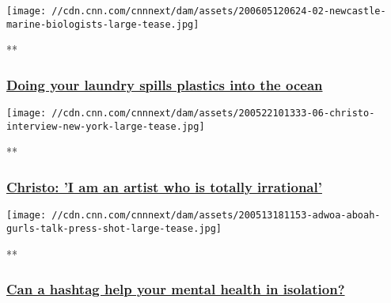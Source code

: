 \href{/videos/fashion/2020/06/05/plastic-microfiber-laundry-solutions-oceans-project-planet-lon-orig.cnn-style/video/playlists/cnn-style/}{}

\texttt{[image: //cdn.cnn.com/cnnnext/dam/assets/200605120624-02-newcastle-marine-biologists-large-tease.jpg]}

**

\hypertarget{doing-your-laundry-spills-plastics-into-the-ocean}{%
\subsubsection{\texorpdfstring{\href{/videos/fashion/2020/06/05/plastic-microfiber-laundry-solutions-oceans-project-planet-lon-orig.cnn-style/video/playlists/cnn-style/}{Doing
your laundry spills plastics into the
ocean}}{Doing your laundry spills plastics into the ocean}}\label{doing-your-laundry-spills-plastics-into-the-ocean}}

\href{/videos/arts/2020/05/22/christo-interview-new-york-arc-de-triomphe-lon-orig.cnn/video/playlists/cnn-style/}{}

\texttt{[image: //cdn.cnn.com/cnnnext/dam/assets/200522101333-06-christo-interview-new-york-large-tease.jpg]}

**

\hypertarget{christo-i-am-an-artist-who-is-totally-irrational}{%
\subsubsection{\texorpdfstring{\href{/videos/arts/2020/05/22/christo-interview-new-york-arc-de-triomphe-lon-orig.cnn/video/playlists/cnn-style/}{Christo:
'I am an artist who is totally
irrational'}}{Christo: 'I am an artist who is totally irrational'}}\label{christo-i-am-an-artist-who-is-totally-irrational}}

\href{/videos/fashion/2020/05/13/adwoa-aboah-gurls-talk-coronavirus-mental-health-wellness-lon-orig.cnn/video/playlists/cnn-style/}{}

\texttt{[image: //cdn.cnn.com/cnnnext/dam/assets/200513181153-adwoa-aboah-gurls-talk-press-shot-large-tease.jpg]}

**

\hypertarget{can-a-hashtag-help-your-mental-health-in-isolation}{%
\subsubsection{\texorpdfstring{\href{/videos/fashion/2020/05/13/adwoa-aboah-gurls-talk-coronavirus-mental-health-wellness-lon-orig.cnn/video/playlists/cnn-style/}{Can
a hashtag help your mental health in
isolation?}}{Can a hashtag help your mental health in isolation?}}\label{can-a-hashtag-help-your-mental-health-in-isolation}}

